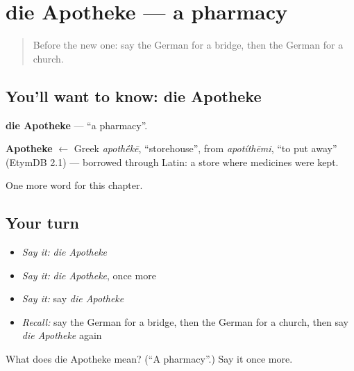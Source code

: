 \section[die Apotheke]{die Apotheke — a pharmacy}

\label{lesson:GE-C97-apotheke}



\begin{quote}
Before the new one: say the German for a bridge, then the German for a church.
\end{quote}

\subsection*{You'll want to know: die Apotheke}
\textbf{die Apotheke} — \textquotedblleft{}a pharmacy\textquotedblright{}.

\begin{cousinweb}
\textbf{Apotheke} $\leftarrow$ Greek \emph{apoth\'{\={e}}kē}, \textquotedblleft{}storehouse\textquotedblright{}, from \emph{apotíthēmi}, \textquotedblleft{}to put away\textquotedblright{} (EtymDB 2.1) — borrowed through Latin: a store where medicines were kept.
\end{cousinweb}

\begin{grammarlens}[title={What you've built}]
One more word for this chapter.
\end{grammarlens}

\subsection*{Your turn}
\begin{itemize}
\raggedright
  \item \emph{Say it:} \emph{die Apotheke}
  \item \emph{Say it:} \emph{die Apotheke}, once more
  \item \emph{Say it:} say \emph{die Apotheke}
  \item \emph{Recall:} say the German for a bridge, then the German for a church, then say \emph{die Apotheke} again
\end{itemize}

\begin{tcolorbox}[breakable,colback=teal!4,colframe=teal!35!black,title={Before you move on}]
What does die Apotheke mean? (\textquotedblleft{}A pharmacy\textquotedblright{}.) Say it once more.
\end{tcolorbox}
